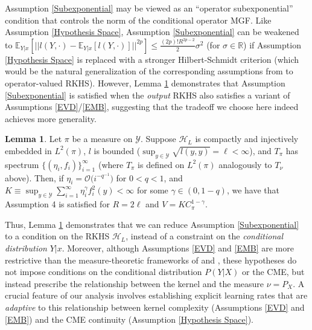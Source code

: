 \documentclass[accepted]{article}
\theoremstyle{definition}
\newtheorem{lemma}[theorem]{Lemma}
\begin{document}
\par Assumption \ref{Subexponential} may be viewed as an ``operator subexponential'' condition that controls the norm of the conditional operator MGF. Like  Assumption \ref{Hypothesis Space}, Assumption \ref{Subexponential} can be weakened to  $\mathbb{E}_{Y|x}[||l(Y, \cdot) - \mathbb{E}_{Y|x}[l(Y, \cdot)]||^{2p}] \leq \frac{(2p)!R^{2p - 2}}{2}\sigma^2$ (for $\sigma \in \mathbb{R}$) if Assumption \ref{Hypothesis Space} is replaced with a stronger Hilbert-Schmidt criterion (which would be the natural generalization of the corresponding assumptions from \cite{fischer2020sobolev} to operator-valued RKHS). However, Lemma \ref{Satisfying Moment Condition} demonstrates that Assumption \ref{Subexponential} is satisfied when the \textit{output} RKHS also satisfies a variant of Assumptions \ref{EVD}/\ref{EMB}, suggesting that the tradeoff we choose here indeed achieves more generality. 

\begin{lemma}
\label{Satisfying Moment Condition}
Let $\pi$ be a measure on $\mathcal{Y}$. Suppose $\mathcal{H}_{L}$ is compactly and injectively embedded in $L^2(\pi)$, $l$ is bounded ($\sup_{y \in \mathcal{Y}} \sqrt{l(y, y)} = \ell < \infty$), and $T_{\pi}$ has spectrum $\{(\eta_i, f_i)\}_{i = 1}^{\infty}$ (where $T_{\pi}$ is defined on $L^2(\pi)$ analogously to $T_{\nu}$ above). Then, if $\eta_i = \mathcal{O}\Big(i^{-q^{-1}}\Big)$ for $0 < q < 1$, and $K \equiv \sup_{y \in \mathcal{Y}} \sum_{i = 1}^{\infty} \eta^{\gamma}_if^2_i(y) < \infty$ for some $\gamma \in (0, 1-q)$, we have that Assumption 4 is satisfied for $R = 2\ell$ and $V = KC^{1 - \gamma}_{\pi}$.
\end{lemma}

Thus, Lemma \ref{Satisfying Moment Condition} demonstrates that we can reduce Assumption \ref{Subexponential} to a condition on the RKHS $\mathcal{H}_L$, instead of a constraint on the \textit{conditional distribution} $Y|x$. Moreover, although Assumptions \ref{EVD} and \ref{EMB} are more restrictive than the measure-theoretic frameworks of \cite{mollenhauer2020kernel} and \cite{park2020measure}, these hypotheses do not impose conditions on the conditional distribution $P(Y|X)$ or the CME, but instead prescribe the relationship between the kernel and the measure $\nu = P_{X}$. A crucial feature of our analysis involves establishing explicit learning rates that are \textit{adaptive} to this relationship between kernel complexity (Assumptions \ref{EVD} and \ref{EMB}) and the CME continuity (Assumption \ref{Hypothesis Space}). 
\end{document}
